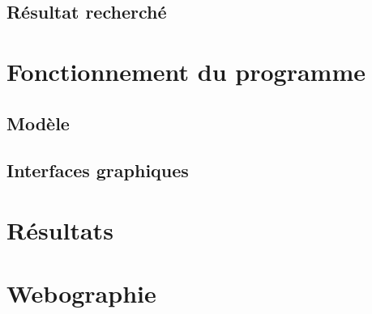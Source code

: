\documentclass[12pt]{report}
\begin{document}
	\subsection{Résultat recherché}
\section{Fonctionnement du programme}
	\subsection{Modèle}
	\subsection{Interfaces graphiques}
\section{Résultats}

\newpage
\section{Webographie}
\end{document}
